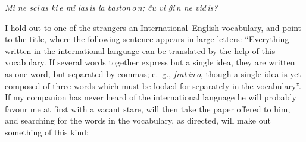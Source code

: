 \documentclass[12pt,twoside]{book}
\begin{document}
    \emph{Mi ne sci\,as ki\,e mi las\,is la baston\,o\,n; ĉu vi ĝi\,n ne vid\,is?}

I hold out to one of the strangers an International--English vocabulary, and point to the title, where the following sentence appears in large letters: “Everything written in the international language can be translated by the help of this vocabulary. If several words together express but a single idea, they are written as one word, but separated by commas; e.~g., \emph{frat\,in\,o}, though a single idea is yet composed of three words which must be looked for separately in the vocabulary”. If my companion has never heard of the international language he will probably favour me at first with a vacant stare, will then take the paper offered to him, and searching for the words in the vocabulary, as directed, will make out something of this kind:

\smaller
\end{document}
